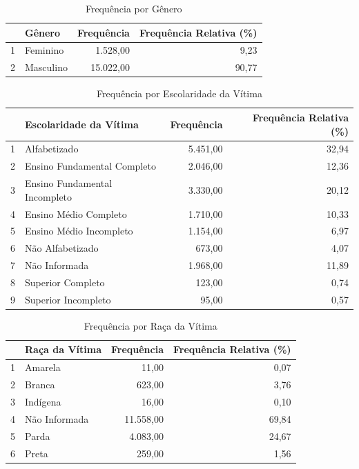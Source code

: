\documentclass{exam}
\begin{document}
\begin{questions}
\begin{table}[H]
    \centering
    \begin{tabular}{rlrr}
        \toprule
        & \textbf{Gênero} & \textbf{Frequência} & \textbf{Frequência Relativa (\%)} \\ 
        \midrule
        1 & Feminino & 1.528,00 & 9,23 \\ 
        2 & Masculino & 15.022,00 & 90,77 \\ 
        \bottomrule
    \end{tabular}
    \caption{Frequência por Gênero}
    \label{tab:freq_genero}
\end{table}

\begin{table}[H]
    \centering
    \begin{tabular}{rlrr}
        \toprule
        & \textbf{Escolaridade da Vítima} & \textbf{Frequência} & \textbf{Frequência Relativa (\%)} \\ 
        \midrule
        1 & Alfabetizado & 5.451,00 & 32,94 \\ 
        2 & Ensino Fundamental Completo & 2.046,00 & 12,36 \\ 
        3 & Ensino Fundamental Incompleto & 3.330,00 & 20,12 \\ 
        4 & Ensino Médio Completo & 1.710,00 & 10,33 \\ 
        5 & Ensino Médio Incompleto & 1.154,00 & 6,97 \\ 
        6 & Não Alfabetizado & 673,00 & 4,07 \\ 
        7 & Não Informada & 1.968,00 & 11,89 \\ 
        8 & Superior Completo & 123,00 & 0,74 \\ 
        9 & Superior Incompleto & 95,00 & 0,57 \\ 
        \bottomrule
    \end{tabular}
    \caption{Frequência por Escolaridade da Vítima}
    \label{tab:freq_escolaridade}
\end{table}

\begin{table}[H]
    \centering
    \begin{tabular}{rlrr}
        \toprule
        & \textbf{Raça da Vítima} & \textbf{Frequência} & \textbf{Frequência Relativa (\%)} \\ 
        \midrule
        1 & Amarela & 11,00 & 0,07 \\ 
        2 & Branca & 623,00 & 3,76 \\ 
        3 & Indígena & 16,00 & 0,10 \\ 
        4 & Não Informada & 11.558,00 & 69,84 \\ 
        5 & Parda & 4.083,00 & 24,67 \\ 
        6 & Preta & 259,00 & 1,56 \\ 
        \bottomrule
    \end{tabular}
    \caption{Frequência por Raça da Vítima}
    \label{tab:freq_raca}
\end{table}


\end{questions}
\end{document}
